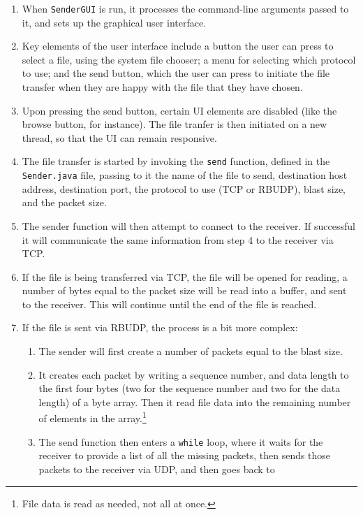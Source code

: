 \documentclass[10pt, a4paper]{article}
\begin{document}
\begin{enumerate}
  \item When \texttt{SenderGUI} is run, it processes the command-line arguments
    passed to it, and sets up the graphical user interface.
  \item Key elements of the user interface include a button the user can press
    to select a file, using the system file chooser; a menu for selecting which protocol to use; and the send button, which the user can press to initiate the file transfer when they are happy with the file that they have chosen.
  \item Upon pressing the send button, certain UI elements are disabled (like
    the browse button, for instance). The file tranfer is then initiated on a
    new thread, so that the UI can remain responsive.
  \item The file transfer is started by invoking the \texttt{send} function,
    defined in the \texttt{Sender.java} file, passing to it the name of the file
    to send, destination host address, destination port, the protocol to use
    (TCP or RBUDP), blast size, and the packet size.
  \item The sender function will then attempt to connect to the receiver. If
    successful it will communicate the same information from step 4 to the receiver via TCP.
  \item If the file is being transferred via TCP, the file will be opened for
    reading, a number of bytes equal to the packet size will be read into a
    buffer, and sent to the receiver. This will continue until the end of the
    file is reached.
  \item If the file is sent via RBUDP, the process is a bit more complex:
    \begin{enumerate}
      \item The sender will first create a number of packets equal to the blast
        size.
      \item It creates each packet by writing a sequence number, and data
        length to the first four bytes (two for the sequence number and two for
        the data length) of a byte array. Then it read file data into the
        remaining number of elements in the array.\footnote{File data is read
        as needed, not all at once.}
      \item The send function then enters a \texttt{while} loop, where it waits
        for the receiver to provide a list of all the missing packets, then
        sends those packets to the receiver via UDP, and then goes back to

\end{enumerate}
\end{enumerate}
\end{document}
